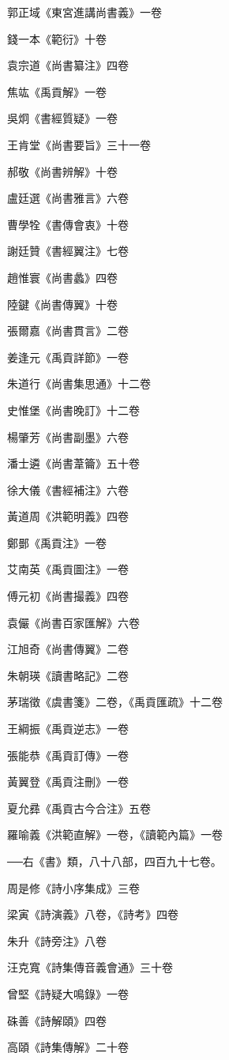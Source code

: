 郭正域《東宮進講尚書義》一卷

錢一本《範衍》十卷

袁宗道《尚書纂注》四卷

焦竑《禹貢解》一卷

吳炯《書經質疑》一卷

王肯堂《尚書要旨》三十一卷

郝敬《尚書辨解》十卷

盧廷選《尚書雅言》六卷

曹學牷《書傳會衷》十卷

謝廷贊《書經翼注》七卷

趙惟寰《尚書蠡》四卷

陸鍵《尚書傳翼》十卷

張爾嘉《尚書貫言》二卷

姜逢元《禹貢詳節》一卷

朱道行《尚書集思通》十二卷

史惟堡《尚書晚訂》十二卷

楊肇芳《尚書副墨》六卷

潘士遴《尚書葦籥》五十卷

徐大儀《書經補注》六卷

黃道周《洪範明義》四卷

鄭鄤《禹貢注》一卷

艾南英《禹貢圖注》一卷

傅元初《尚書撮義》四卷

袁儼《尚書百家匯解》六卷

江旭奇《尚書傳翼》二卷

朱朝瑛《讀書略記》二卷

茅瑞徵《虞書箋》二卷，《禹貢匯疏》十二卷

王綱振《禹貢逆志》一卷

張能恭《禹貢訂傳》一卷

黃翼登《禹貢注刪》一卷

夏允彞《禹貢古今合注》五卷

羅喻義《洪範直解》一卷，《讀範內篇》一卷

──右《書》類，八十八部，四百九十七卷。

周是修《詩小序集成》三卷

梁寅《詩演義》八卷，《詩考》四卷

朱升《詩旁注》八卷

汪克寬《詩集傳音義會通》三十卷

曾堅《詩疑大鳴錄》一卷

硃善《詩解頤》四卷

高頤《詩集傳解》二十卷

